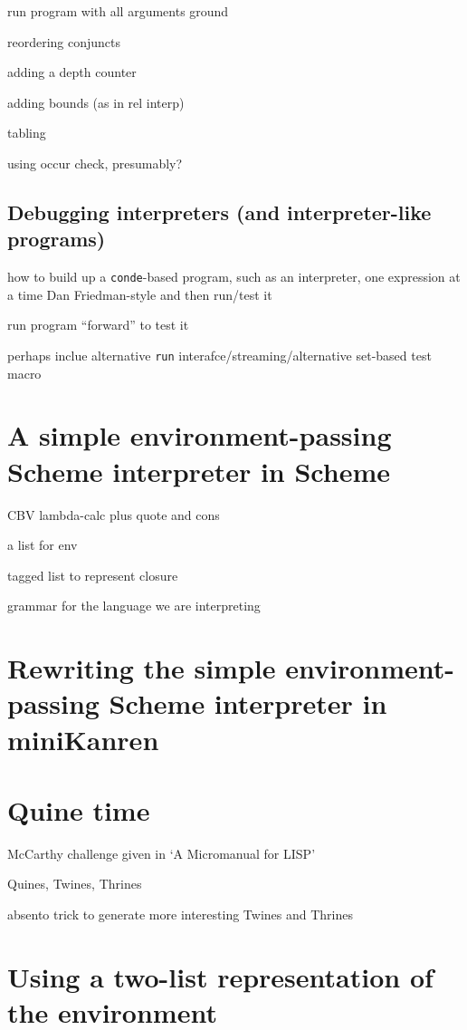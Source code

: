 \documentclass{book}
\begin{document}
run program with all arguments ground

reordering conjuncts

adding a depth counter

adding bounds (as in rel interp)

tabling

using occur check, presumably?

\section{Debugging interpreters (and interpreter-like programs)}

how to build up a \verb|conde|-based program, such as an interpreter, one expression at a time Dan Friedman-style and then run/test it

run program ``forward'' to test it

perhaps inclue alternative \verb|run| interafce/streaming/alternative set-based test macro


\chapter{A simple environment-passing Scheme interpreter in Scheme}%

CBV lambda-calc plus quote and cons

a list for env

tagged list to represent closure

grammar for the language we are interpreting


\chapter{Rewriting the simple environment-passing Scheme interpreter in miniKanren}%


\chapter{Quine time}%

McCarthy challenge given in `A Micromanual for LISP'

Quines, Twines, Thrines

absento trick to generate more interesting Twines and Thrines


\chapter{Using a two-list representation of the environment}%
\end{document}
